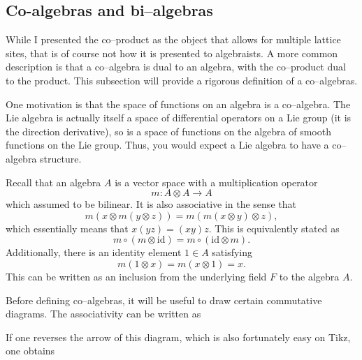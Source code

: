\documentclass{ximera}
\begin{document}
\subsection{Co-algebras and bi--algebras}
While I presented the co--product as the object that allows for multiple lattice sites, that is of 
course not how it is presented to algebraists. A more common description is that a co--algebra is
dual to an algebra, with the co--product dual to the product. This subsection will provide a rigorous
definition of a co--algebras.

One motivation is that the space of functions on an algebra is a co--algebra. The Lie algebra is
actually itself a space of differential operators on a Lie group (it is the direction derivative), 
so is a space of functions on the algebra of smooth functions on the Lie group. Thus, you would
expect a Lie algebra to have a co--algebra structure.


Recall that an algebra \(A\) is a vector space with a multiplication operator
\[
m: A \otimes A \rightarrow A   
\]
which assumed to be bilinear. It is also associative in the sense that
\[
m(x \otimes m(y \otimes z)) = m(m(x \otimes y) \otimes z),   
\]
which essentially means that \( x(yz) = (xy)z.\) This is equivalently stated as
\[
m \circ (m \otimes \mathrm{id})   = m \circ (\mathrm{id} \otimes m).
\]
Additionally, there is an identity element \(1 \in A\) satisfying
\[
m(1 \otimes x) = m(x \otimes 1) = x.   
\]
This can be written as an inclusion from the underlying field \(F\) to the algebra \(A.\)

Before defining co--algebras, it will be useful to draw certain commutative diagrams. The associativity
can be written as


If one reverses the arrow of this diagram, which is also fortunately easy on Tikz, one obtains

\end{document}
